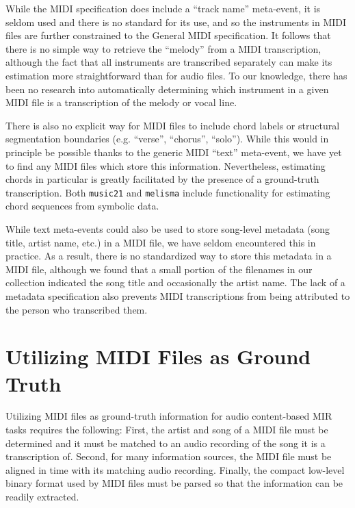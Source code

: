 \documentclass{article}
\begin{document}
While the MIDI specification does include a ``track name'' meta-event, it is seldom used and there is no standard for its use, and so the instruments in MIDI files are further constrained to the General MIDI specification.
It follows that there is no simple way to retrieve the ``melody'' from a MIDI transcription, although the fact that all instruments are transcribed separately can make its estimation more straightforward than for audio files.
To our knowledge, there has been no research into automatically determining which instrument in a given MIDI file is a transcription of the melody or vocal line.

There is also no explicit way for MIDI files to include chord labels or structural segmentation boundaries (e.g. ``verse'', ``chorus'', ``solo'').
While this would in principle be possible thanks to the generic MIDI ``text'' meta-event, we have yet to find any MIDI files which store this information.
Nevertheless, estimating chords in particular is greatly facilitated by the presence of a ground-truth transcription.
Both \texttt{music21} \cite{cuthbert2010music21} and \texttt{melisma} \cite{sleator2001melisma} include functionality for estimating chord sequences from symbolic data.

While text meta-events could also be used to store song-level metadata (song title, artist name, etc.) in a MIDI file, we have seldom encountered this in practice.
As a result, there is no standardized way to store this metadata in a MIDI file, although we found that a small portion of the filenames in our collection indicated the song title and occasionally the artist name.
The lack of a metadata specification also prevents MIDI transcriptions from being attributed to the person who transcribed them.

\section{Utilizing MIDI Files as Ground Truth}
\label{sec:utilizing}

Utilizing MIDI files as ground-truth information for audio content-based MIR tasks requires the following:
First, the artist and song of a MIDI file must be determined and it must be matched to an audio recording of the song it is a transcription of.
Second, for many information sources, the MIDI file must be aligned in time with its matching audio recording.
Finally, the compact low-level binary format used by MIDI files must be parsed so that the information can be readily extracted.
\end{document}
